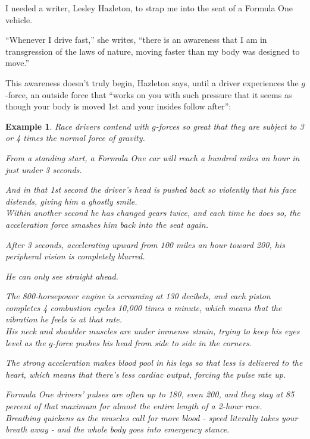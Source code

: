 \documentclass{book}
\numberwithin{equation}{section}
\newtheorem{example}{Example}[chapter]
\begin{document}
I needed a writer, Lesley Hazleton, to strap me into the seat of a Formula One vehicle.

``Whenever I drive fast,'' she writes, ``there is an awareness that I am in transgression of the laws of nature, moving faster than my body was designed to move.''

This awareness doesn't truly begin, Hazleton says, until a driver experiences the $g$-force, an outside force that ``works on you with such pressure that it seems as though your body is moved 1st and your insides follow after'':
\begin{example}
    Race drivers contend with $g$-forces so great that they are subject to 3 or 4 times the normal force of gravity.
    
    From a standing start, a Formula One car will reach a hundred miles an hour in just under 3 seconds.
    
    And in that 1st second the driver's head is pushed back so violently that his face distends, giving him a ghostly smile.
    \\
    
    Within another second he has changed gears twice, and each time he does so, the acceleration force smashes him back into the seat again.
    
    After 3 seconds, accelerating upward from 100 miles an hour toward 200, his peripheral vision is completely blurred.
    
    He can only see straight ahead.
    
    The 800-horsepower engine is screaming at 130 decibels, and each piston completes 4 combustion cycles 10,000 times a minute, which means that the vibration he feels is at that rate.
    \\
    
    His neck and shoulder muscles are under immense strain, trying to keep his eyes level as the $g$-force pushes his head from side to side in the corners.
    
    The strong acceleration makes blood pool in his legs so that less is delivered to the heart, which means that there's less cardiac output, forcing the pulse rate up.
    
    Formula One drivers' pulses are often up to 180, even 200, and they stay at 85 percent of that maximum for almost the entire length of a 2-hour race.
    \\
    
    Breathing quickens as the muscles call for more blood - speed literally takes your breath away - and the whole body goes into emergency stance.
    

\end{example}
\end{document}
